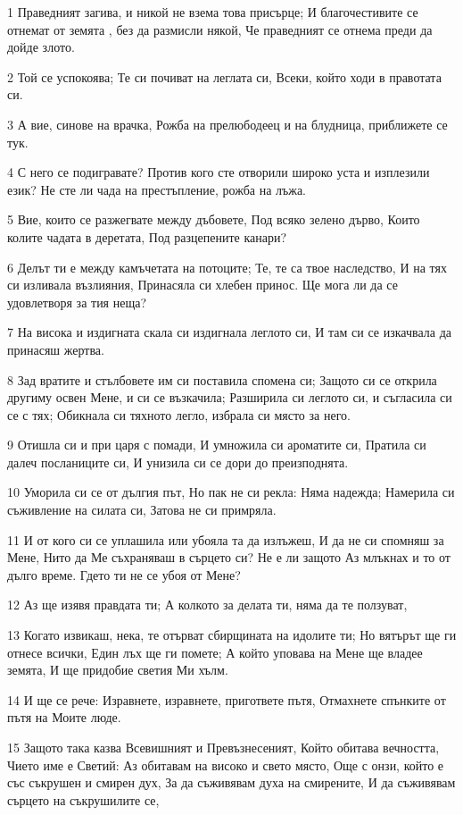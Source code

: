 \par 1 Праведният загива, и никой не взема това присърце; И благочестивите се отнемат от земята , без да размисли някой, Че праведният се отнема преди да дойде злото.
\par 2 Той се успокоява; Те си почиват на леглата си, Всеки, който ходи в правотата си.
\par 3 А вие, синове на врачка, Рожба на прелюбодеец и на блудница, приближете се тук.
\par 4 С него се подигравате? Против кого сте отворили широко уста и изплезили език? Не сте ли чада на престъпление, рожба на лъжа.
\par 5 Вие, които се разжегвате между дъбовете, Под всяко зелено дърво, Които колите чадата в деретата, Под разцепените канари?
\par 6 Делът ти е между камъчетата на потоците; Те, те са твое наследство, И на тях си изливала възлияния, Принасяла си хлебен принос. Ще мога ли да се удовлетворя за тия неща?
\par 7 На висока и издигната скала си издигнала леглото си, И там си се изкачвала да принасяш жертва.
\par 8 Зад вратите и стълбовете им си поставила спомена си; Защото си се открила другиму освен Мене, и си се възкачила; Разширила си леглото си, и съгласила си се с тях; Обикнала си тяхното легло, избрала си място за него.
\par 9 Отишла си и при царя с помади, И умножила си ароматите си, Пратила си далеч посланиците си, И унизила си се дори до преизподнята.
\par 10 Уморила си се от дългия път, Но пак не си рекла: Няма надежда; Намерила си съживление на силата си, Затова не си примряла.
\par 11 И от кого си се уплашила или убояла та да излъжеш, И да не си спомняш за Мене, Нито да Ме съхраняваш в сърцето си? Не е ли защото Аз млъкнах и то от дълго време. Гдето ти не се убоя от Мене?
\par 12 Аз ще изявя правдата ти; А колкото за делата ти, няма да те ползуват,
\par 13 Когато извикаш, нека, те отърват сбирщината на идолите ти; Но вятърът ще ги отнесе всички, Един лъх ще ги помете; А който уповава на Мене ще владее земята, И ще придобие светия Ми хълм.
\par 14 И ще се рече: Изравнете, изравнете, пригответе пътя, Отмахнете спънките от пътя на Моите люде.
\par 15 Защото така казва Всевишният и Превъзнесеният, Който обитава вечността, Чието име е Светий: Аз обитавам на високо и свето място, Още с онзи, който е със съкрушен и смирен дух, За да съживявам духа на смирените, И да съживявам сърцето на съкрушилите се,
